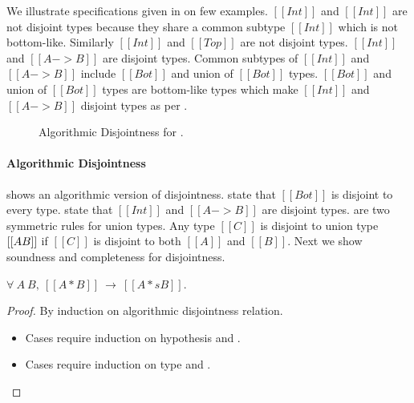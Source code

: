 \noindent We illustrate specifications given in  on few examples. 
$[[Int]]$ and $[[Int]]$ are not disjoint types because they share a common subtype $[[Int]]$ which
is not bottom-like. Similarly $[[Int]]$ and $[[Top]]$ are not disjoint types. $[[Int]]$ and $[[A -> B]]$
are disjoint types. Common subtypes of $[[Int]]$ and $[[A -> B]]$ include $[[Bot]]$ and union of 
$[[Bot]]$ types. $[[Bot]]$ and union of $[[Bot]]$ types are bottom-like types which make $[[Int]]$ and 
$[[A -> B]]$ disjoint types as per .

\begin{figure}[t]
  \begin{small}
    \centering
  \end{small}
  \caption{Algorithmic Disjointness for \dut.}
  \label{fig:union:ad}
\end{figure}

\paragraph{Algorithmic Disjointness}
\noindent {} shows an algorithmic version of disjointness.
 state that $[[Bot]]$ is disjoint to every type.
 state that $[[Int]]$ and $[[A -> B]]$ are disjoint types.
 are two symmetric rules for union types. Any type $[[C]]$ is disjoint
to union type $[[A \/ B]]$ if $[[C]]$ is disjoint to both $[[A]]$ and $[[B]]$. Next we show
soundness and completeness for disjointness.

\begin{lemma}
\label{lemma:union:disj-sound}
$\forall ~ A ~ B, ~[[A * B]] ~ \rightarrow ~ [[A *s B]]$.
\end{lemma}

\begin{proof}
  By induction on algorithmic disjointness relation.
  \begin{itemize}
    \item Cases  require induction on hypothesis
          and .
    \item Cases  require induction on type and .
  \end{itemize}
\end{proof}


